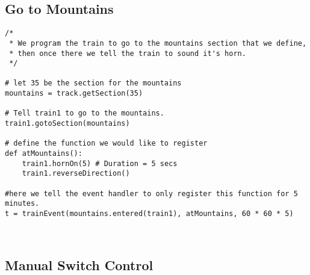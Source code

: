 \documentclass[a4paper,11pt,notitlepage]{article}
\begin{document}
\subsection{Go to Mountains}
\begin{verbatim}
/*
 * We program the train to go to the mountains section that we define,
 * then once there we tell the train to sound it's horn.
 */

# let 35 be the section for the mountains
mountains = track.getSection(35) 

# Tell train1 to go to the mountains.
train1.gotoSection(mountains)

# define the function we would like to register
def atMountains():
	train1.hornOn(5) # Duration = 5 secs
    train1.reverseDirection()

#here we tell the event handler to only register this function for 5 minutes.
t = trainEvent(mountains.entered(train1), atMountains, 60 * 60 * 5) 
 


\end{verbatim}
\subsection{Manual Switch Control}
\begin{verbatim}
\end{verbatim}
\end{document}
